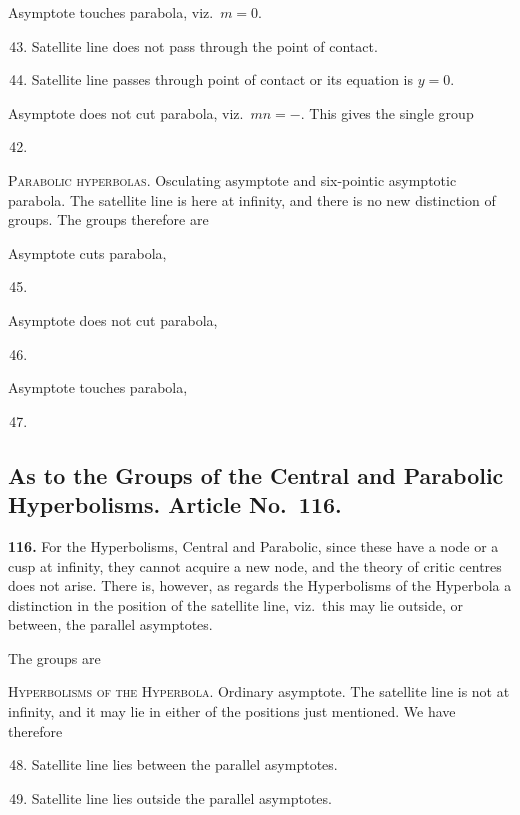 \documentclass[11pt,a4paper]{article}
\theoremstyle{plain}
\begin{document}
Asymptote touches parabola, viz.\ $m = 0$.
\begin{enumerate}[label=\textsc{\Roman*.},nosep]
\setcounter{enumi}{42}
\item Satellite line does not pass through the point of contact.
\item Satellite line passes through point of contact or its equation is $y = 0$.
\end{enumerate}

Asymptote does not cut parabola, viz.\ $mn = -$. This gives the single group
\begin{enumerate}[label=\textsc{\Roman*.},nosep]
\setcounter{enumi}{41}
\item
\end{enumerate}

\textsc{Parabolic hyperbolas.} Osculating asymptote and six-pointic asymptotic parabola. The satellite line is here at infinity, and there is no new distinction of groups. The groups therefore are

Asymptote cuts parabola,
\begin{enumerate}[label=\textsc{\Roman*.},nosep]
\setcounter{enumi}{44}
\item
\end{enumerate}
Asymptote does not cut parabola,
\begin{enumerate}[label=\textsc{\Roman*.},nosep]
\setcounter{enumi}{45}
\item
\end{enumerate}
Asymptote touches parabola,
\begin{enumerate}[label=\textsc{\Roman*.},nosep]
\setcounter{enumi}{46}
\item
\end{enumerate}

\subsection*{As to the Groups of the Central and Parabolic Hyperbolisms. Article No.\ 116.}

\noindent\textbf{116.} For the Hyperbolisms, Central and Parabolic, since these have a node or a cusp at infinity, they cannot acquire a new node, and the theory of critic centres does not arise. There is, however, as regards the Hyperbolisms of the Hyperbola a distinction in the position of the satellite line, viz.\ this may lie outside, or between, the parallel asymptotes.

The groups are

\textsc{Hyperbolisms of the Hyperbola.} Ordinary asymptote. The satellite line is not at infinity, and it may lie in either of the positions just mentioned. We have therefore
\begin{enumerate}[label=\textsc{\Roman*.},nosep]
\setcounter{enumi}{47}
\item Satellite line lies between the parallel asymptotes.
\item Satellite line lies outside the parallel asymptotes.
\end{enumerate}
\end{document}

